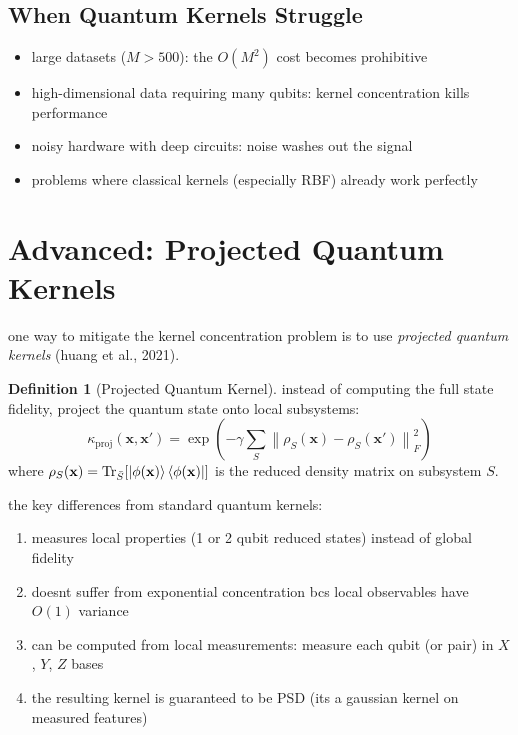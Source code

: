 \documentclass[11pt,a4paper]{article}
\theoremstyle{definition}
\newtheorem{definition}{Definition}[section]
\theoremstyle{remark}
\begin{document}
\subsection{When Quantum Kernels Struggle}

\begin{itemize}[leftmargin=*]
    \item large datasets ($M > 500$): the $O(M^2)$ cost becomes prohibitive
    \item high-dimensional data requiring many qubits: kernel concentration kills performance
    \item noisy hardware with deep circuits: noise washes out the signal
    \item problems where classical kernels (especially RBF) already work perfectly
\end{itemize}

\section{Advanced: Projected Quantum Kernels}

one way to mitigate the kernel concentration problem is to use \emph{projected quantum kernels} (huang et al., 2021).

\begin{definition}[Projected Quantum Kernel]
instead of computing the full state fidelity, project the quantum state onto local subsystems:
\[
\kappa_{\text{proj}}(\mathbf{x}, \mathbf{x}') = \exp\!\left(-\gamma \sum_{S} \left\| \rho_S(\mathbf{x}) - \rho_S(\mathbf{x}') \right\|_F^2 \right)
\]
where $\rho_S(\mathbf{x}) = \text{Tr}_{\bar{S}}[\ket{\phi(\mathbf{x})}\bra{\phi(\mathbf{x})}]$ is the reduced density matrix on subsystem $S$.
\end{definition}

the key differences from standard quantum kernels:
\begin{enumerate}[leftmargin=*]
    \item measures local properties (1 or 2 qubit reduced states) instead of global fidelity
    \item doesnt suffer from exponential concentration bcs local observables have $O(1)$ variance
    \item can be computed from local measurements: measure each qubit (or pair) in $X$, $Y$, $Z$ bases
    \item the resulting kernel is guaranteed to be PSD (its a gaussian kernel on measured features)
\end{enumerate}
\end{document}
